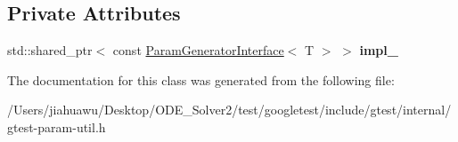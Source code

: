 \subsection*{Private Attributes}
\begin{DoxyCompactItemize}
\item 
\mbox{\label{classtesting_1_1internal_1_1_param_generator_a2ea0b72d470d5a961272c2b818a3f78d}} 
std\+::shared\+\_\+ptr$<$ const \mbox{\hyperlink{classtesting_1_1internal_1_1_param_generator_interface}{Param\+Generator\+Interface}}$<$ T $>$ $>$ {\bfseries impl\+\_\+}
\end{DoxyCompactItemize}


The documentation for this class was generated from the following file\+:\begin{DoxyCompactItemize}
\item 
/\+Users/jiahuawu/\+Desktop/\+O\+D\+E\+\_\+\+Solver2/test/googletest/include/gtest/internal/gtest-\/param-\/util.\+h\end{DoxyCompactItemize}
